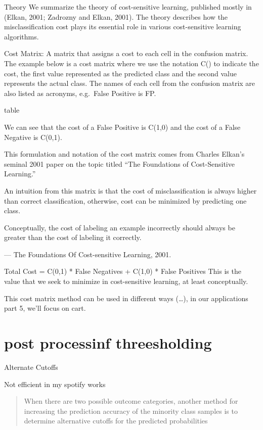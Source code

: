 \documentclass[
]{report}
\begin{document}
Theory
We summarize the theory of cost-sensitive learning, published mostly in (Elkan, 2001; Zadrozny
and Elkan, 2001). The theory describes how the misclassification cost plays its essential role in
various cost-sensitive learning algorithms.

Cost Matrix: A matrix that assigns a cost to each cell in the confusion matrix.
The example below is a cost matrix where we use the notation C() to indicate the cost, the first value represented as the predicted class and the second value represents the actual class. The names of each cell from the confusion matrix are also listed as acronyms, e.g.~False Positive is FP.

table

We can see that the cost of a False Positive is C(1,0) and the cost of a False Negative is C(0,1).

This formulation and notation of the cost matrix comes from Charles Elkan's seminal 2001 paper on the topic titled ``The Foundations of Cost-Sensitive Learning.''

An intuition from this matrix is that the cost of misclassification is always higher than correct classification, otherwise, cost can be minimized by predicting one class.

Conceptually, the cost of labeling an example incorrectly should always be greater than the cost of labeling it correctly.

--- The Foundations Of Cost-sensitive Learning, 2001.

Total Cost = C(0,1) * False Negatives + C(1,0) * False Positives
This is the value that we seek to minimize in cost-sensitive learning, at least conceptually.

This cost matrix method can be used in different ways (\ldots), in our applications part 5, we'll focus on cart.

\hypertarget{post-processinf-threesholding}{%
\section{post processinf threesholding}\label{post-processinf-threesholding}}

Alternate Cutoffs

Not efficient in my spotify works

\begin{quote}
When there are two possible outcome categories, another method for increasing the prediction accuracy of the minority class samples is to determine alternative cutoﬀs for the predicted probabilities
\end{quote}
\end{document}
